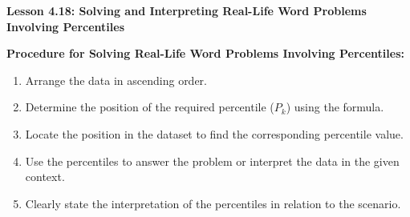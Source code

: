 \begin{center}
\textbf{Lesson 4.18: Solving and Interpreting Real-Life Word Problems Involving Percentiles}
\end{center}

\vspace*{-1.5ex}

\noindent\textbf{Procedure for Solving Real-Life Word Problems Involving Percentiles:}  
\begin{enumerate}
    \item Arrange the data in ascending order.  
    \item Determine the position of the required percentile (\(P_k\)) using the formula.  
    \item Locate the position in the dataset to find the corresponding percentile value.  
    \item Use the percentiles to answer the problem or interpret the data in the given context.  
    \item Clearly state the interpretation of the percentiles in relation to the scenario.
\end{enumerate}
